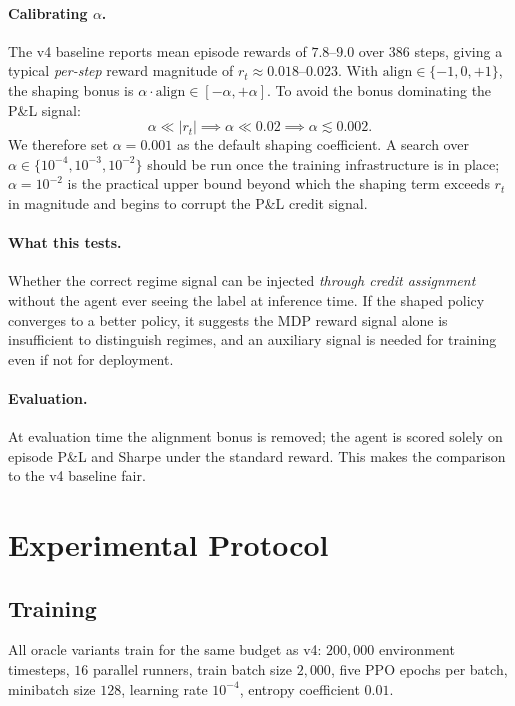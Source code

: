 \documentclass[11pt]{article}
\begin{document}
\paragraph{Calibrating $\alpha$.}
The v4 baseline reports mean episode rewards of $7.8$--$9.0$ over $386$
steps, giving a typical \emph{per-step} reward magnitude of
$r_t \approx 0.018$--$0.023$.
With $\text{align} \in \{-1, 0, +1\}$, the shaping bonus is $\alpha \cdot
\text{align} \in [-\alpha, +\alpha]$.
To avoid the bonus dominating the P\&L signal:
\[
  \alpha \ll |r_t| \implies \alpha \ll 0.02
  \implies \alpha \lesssim 0.002.
\]
We therefore set $\alpha = 0.001$ as the default shaping coefficient.
A search over $\alpha \in \{10^{-4}, 10^{-3}, 10^{-2}\}$ should be run
once the training infrastructure is in place; $\alpha = 10^{-2}$ is the
practical upper bound beyond which the shaping term exceeds $r_t$ in
magnitude and begins to corrupt the P\&L credit signal.

\paragraph{What this tests.}
Whether the correct regime signal can be injected \emph{through credit
assignment} without the agent ever seeing the label at inference time.
If the shaped policy converges to a better policy, it suggests the MDP
reward signal alone is insufficient to distinguish regimes, and an
auxiliary signal is needed for training even if not for deployment.

\paragraph{Evaluation.}
At evaluation time the alignment bonus is removed; the agent is scored
solely on episode P\&L and Sharpe under the standard reward. This makes
the comparison to the v4 baseline fair.

\section{Experimental Protocol}
\label{sec:protocol}

\subsection{Training}

All oracle variants train for the same budget as v4: $200{,}000$ environment
timesteps, $16$ parallel runners, train batch size $2{,}000$, five PPO
epochs per batch, minibatch size $128$, learning rate $10^{-4}$, entropy
coefficient $0.01$.
\end{document}
